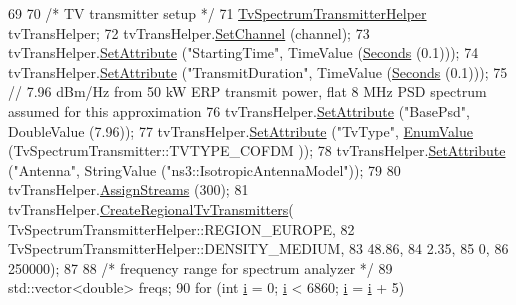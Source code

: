 \begin{DoxyCode}
69   
70   \textcolor{comment}{/* TV transmitter setup */}
71   \hyperlink{classns3_1_1TvSpectrumTransmitterHelper}{TvSpectrumTransmitterHelper} tvTransHelper;
72   tvTransHelper.\hyperlink{classns3_1_1TvSpectrumTransmitterHelper_a14d44a79d659b99a2e80916eadefbd54}{SetChannel} (channel);
73   tvTransHelper.\hyperlink{classns3_1_1TvSpectrumTransmitterHelper_af602e03cad3ae4cabafcb127c888fb53}{SetAttribute} (\textcolor{stringliteral}{"StartingTime"}, TimeValue (\hyperlink{group__timecivil_ga33c34b816f8ff6628e33d5c8e9713b9e}{Seconds} (0.1)));
74   tvTransHelper.\hyperlink{classns3_1_1TvSpectrumTransmitterHelper_af602e03cad3ae4cabafcb127c888fb53}{SetAttribute} (\textcolor{stringliteral}{"TransmitDuration"}, TimeValue (\hyperlink{group__timecivil_ga33c34b816f8ff6628e33d5c8e9713b9e}{Seconds} (0.1)));
75   \textcolor{comment}{// 7.96 dBm/Hz from 50 kW ERP transmit power, flat 8 MHz PSD spectrum assumed for this approximation }
76   tvTransHelper.\hyperlink{classns3_1_1TvSpectrumTransmitterHelper_af602e03cad3ae4cabafcb127c888fb53}{SetAttribute} (\textcolor{stringliteral}{"BasePsd"}, DoubleValue (7.96));
77   tvTransHelper.\hyperlink{classns3_1_1TvSpectrumTransmitterHelper_af602e03cad3ae4cabafcb127c888fb53}{SetAttribute} (\textcolor{stringliteral}{"TvType"}, \hyperlink{classns3_1_1EnumValue}{EnumValue} (TvSpectrumTransmitter::TVTYPE\_COFDM
      ));
78   tvTransHelper.\hyperlink{classns3_1_1TvSpectrumTransmitterHelper_af602e03cad3ae4cabafcb127c888fb53}{SetAttribute} (\textcolor{stringliteral}{"Antenna"}, StringValue (\textcolor{stringliteral}{"ns3::IsotropicAntennaModel"}));
79 
80   tvTransHelper.\hyperlink{classns3_1_1TvSpectrumTransmitterHelper_ae862f97e3cec251b391b2ec27b2e9bf3}{AssignStreams} (300);
81   tvTransHelper.\hyperlink{classns3_1_1TvSpectrumTransmitterHelper_aebb24cb396c43e4f0355c04b2506bb35}{CreateRegionalTvTransmitters}(
      TvSpectrumTransmitterHelper::REGION\_EUROPE, 
82                                              TvSpectrumTransmitterHelper::DENSITY\_MEDIUM, 
83                                              48.86, 
84                                              2.35, 
85                                              0,
86                                              250000);
87 
88   \textcolor{comment}{/* frequency range for spectrum analyzer */}
89   std::vector<double> freqs;
90   \textcolor{keywordflow}{for} (\textcolor{keywordtype}{int} \hyperlink{bernuolliDistribution_8m_a6f6ccfcf58b31cb6412107d9d5281426}{i} = 0; \hyperlink{bernuolliDistribution_8m_a6f6ccfcf58b31cb6412107d9d5281426}{i} < 6860; \hyperlink{bernuolliDistribution_8m_a6f6ccfcf58b31cb6412107d9d5281426}{i} = \hyperlink{bernuolliDistribution_8m_a6f6ccfcf58b31cb6412107d9d5281426}{i} + 5)

\end{DoxyCode}
